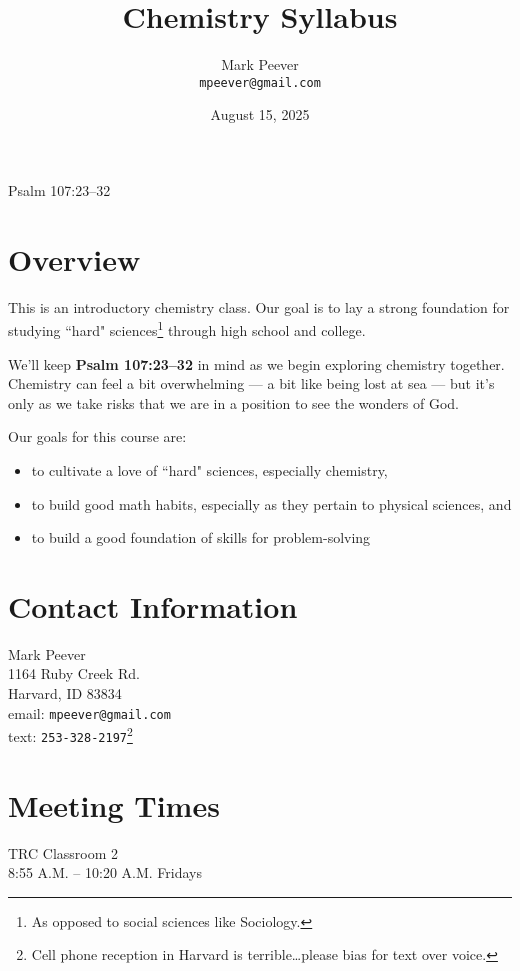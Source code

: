 \documentclass[11pt, oneside]{article}   	%
\title{Chemistry Syllabus}
\author{Mark Peever\\ \texttt{mpeever@gmail.com}}
\date{August 15, 2025}
\begin{document}
\maketitle

\begin{center}
Psalm 107:23--32
\end{center}

\section{Overview}
This is an introductory chemistry class. Our goal is to lay a strong foundation for studying ``hard" sciences\footnote{As opposed to social sciences like Sociology.} through high school and college. 

We'll keep \textbf{Psalm 107:23--32} in mind as we begin exploring chemistry together. Chemistry can feel a bit overwhelming --- a bit like being lost at sea --- but it's only as we take risks that we are in a position to see the wonders of God.

Our goals for this course are:
\begin{itemize}
\item to cultivate a love of ``hard" sciences, especially chemistry,
\item to build good math habits, especially as they pertain to physical sciences, and
\item to build a good foundation of skills for problem-solving
\end{itemize}

\section{Contact Information}
Mark Peever\\
1164 Ruby Creek Rd.\\
Harvard, ID 83834 \\
email: \texttt{mpeever@gmail.com} \\
text: \texttt{253-328-2197}\footnote{Cell phone reception in Harvard is terrible\ldots please bias for text over voice.} \\


\section{Meeting Times}
TRC Classroom 2       \\
8:55 A.M. -- 10:20 A.M. Fridays \\ 
\end{document}
